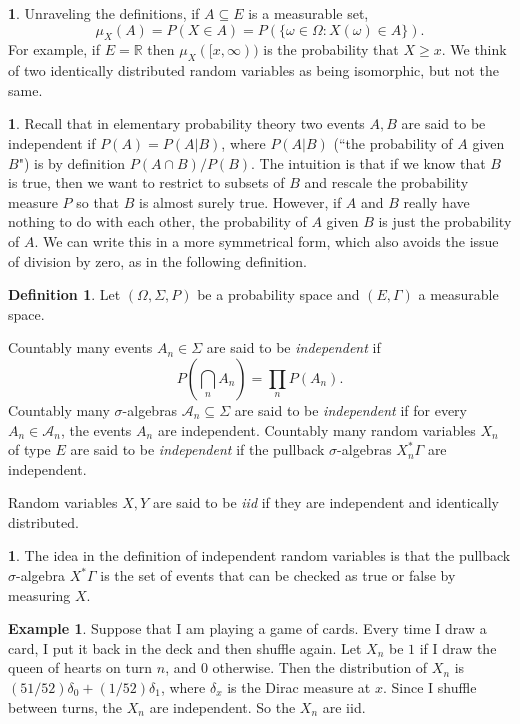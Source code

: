 \documentclass[12pt]{book}
\newcommand{\RR}{\mathbb{R}}
\newcommand{\dfn}[1]{\emph{#1}\index{#1}}
\theoremstyle{definition}
\newtheorem{subsec}[theorem]{}
\newtheorem{definition}[theorem]{Definition}
\newtheorem{example}[theorem]{Example}
\begin{document}
\begin{subsec}
Unraveling the definitions, if $A \subseteq E$ is a measurable set,
$$\mu_X(A) = P(X \in A) = P(\{\omega \in \Omega: X(\omega) \in A\}).$$
For example, if $E = \RR$ then $\mu_X([x, \infty))$ is the probability that $X \geq x$.
We think of two identically distributed random variables as being isomorphic, but not the same.
\end{subsec}

\begin{subsec}
Recall that in elementary probability theory two events $A,B$ are said to be independent if $P(A) = P(A|B)$, where $P(A|B)$ (``the probability of $A$ given $B$") is by definition $P(A \cap B)/P(B)$.
The intuition is that if we know that $B$ is true, then we want to restrict to subsets of $B$ and rescale the probability measure $P$ so that $B$ is almost surely true.
However, if $A$ and $B$ really have nothing to do with each other, the probability of $A$ given $B$ is just the probability of $A$.
We can write this in a more symmetrical form, which also avoids the issue of division by zero, as in the following definition.
\end{subsec}

\begin{definition}
Let $(\Omega, \Sigma, P)$ be a probability space and $(E, \Gamma)$ a measurable space.

Countably many events $A_n \in \Sigma$ are said to be \dfn{independent} if
$$P\left(\bigcap_n A_n\right) = \prod_n P(A_n).$$
Countably many $\sigma$-algebras $\mathcal A_n \subseteq \Sigma$ are said to be \dfn{independent} if for every $A_n \in \mathcal A_n$, the events $A_n$ are independent.
Countably many random variables $X_n$ of type $E$ are said to be \dfn{independent} if the pullback $\sigma$-algebras $X_n^*\Gamma$ are independent.

Random variables $X,Y$ are said to be \dfn{iid} if they are independent and identically distributed.
\end{definition}

\begin{subsec}
The idea in the definition of independent random variables is that the pullback $\sigma$-algebra $X^*\Gamma$ is the set of events that can be checked as true or false by measuring $X$.
\end{subsec}

\begin{example}
Suppose that I am playing a game of cards.
Every time I draw a card, I put it back in the deck and then shuffle again.
Let $X_n$ be $1$ if I draw the queen of hearts on turn $n$, and $0$ otherwise.
Then the distribution of $X_n$ is $(51/52)\delta_0 + (1/52)\delta_1$, where $\delta_x$ is the Dirac measure at $x$.
Since I shuffle between turns, the $X_n$ are independent.
So the $X_n$ are iid.
\end{example}
\end{document}
